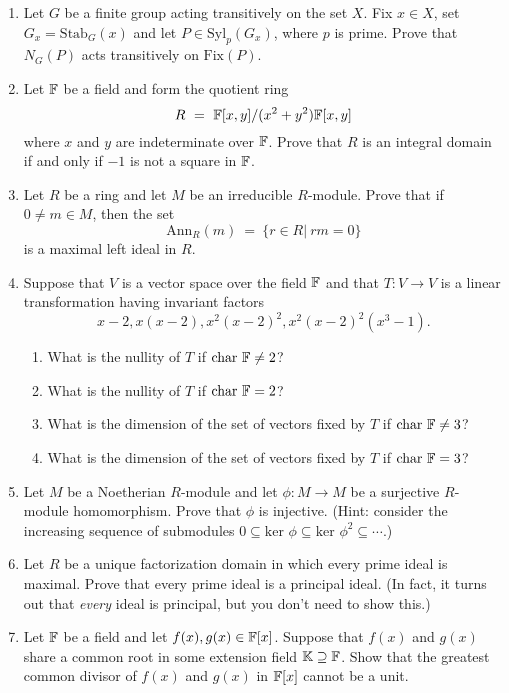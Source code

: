 \documentclass{article}
\begin{document}
\begin{Large}
\begin{enumerate}
\item Let $G$ be a finite group acting transitively on the set $X$. Fix
$x\in X$, set $G_x=\mbox{Stab}_G(x)$ and let $P\in\mbox{Syl}_p(G_x)$,
where $p$ is prime. Prove that $N_G(P)$ acts transitively on $\mbox{Fix}(P)$.

\item Let ${\Bbb F}$ be a field and form the quotient ring
$$R\ =\ {\Bbb F}[x,y]/(x^2+y^2){\Bbb F}[x,y]$$
where $x$ and $y$ are indeterminate over ${\Bbb F}$. Prove that
$R$ is an integral domain if and only if $-1$ is not a square in 
${\Bbb F}$.

\item Let $R$ be a ring and let $M$ be an irreducible $R$-module. Prove
that if $0\not= m\in M$, then the set
$$ \mbox{Ann}_R(m)\ =\ \{r\in R|\ rm=0\}$$
is a maximal left ideal in $R$.

\item Suppose that $V$ is a vector space over the field ${\Bbb F}$ and
that $T:V\to V$ is a linear transformation having invariant factors
$$x-2,x(x-2),x^2(x-2)^2,x^2(x-2)^2(x^3-1).$$
\begin{enumerate}
\item What is the nullity of $T$ if $\mbox{char }{\Bbb F}\not= 2$?
\item What is the nullity of $T$ if $\mbox{char }{\Bbb F}= 2$?
\item What is the dimension of the set of vectors fixed by $T$ if
$\mbox{char }{\Bbb F}\not= 3$?
\item What is the dimension of the set of vectors fixed by $T$ if
$\mbox{char }{\Bbb F}= 3$?
\end{enumerate}

\item Let $M$ be a Noetherian $R$-module and let $\phi :M\to M$ be a
surjective $R$-module homomorphism. Prove that $\phi $ is injective.
(Hint: consider the increasing sequence of submodules $0\subseteq
\mbox{ker }\phi\subseteq \mbox{ker }\phi^2\subseteq\cdots $.)

\item Let $R$ be a unique factorization domain in which every prime
ideal is maximal. Prove that every prime ideal is a principal ideal.
(In fact, it turns out that {\em every} ideal is principal, but you
don't need to show this.)

\item Let ${\Bbb F}$ be a field and let $f(x), g(x)\in {\Bbb F}[x]$. 
Suppose that $f(x)$ and $g(x)$ share a common root in some extension
field  ${\Bbb K}\supseteq {\Bbb F}$. Show that the greatest common divisor
of $f(x)$ and $g(x)$  in ${\Bbb F}[x]$ cannot be a unit. 


\end{enumerate}
\end{Large}
\end{document}
